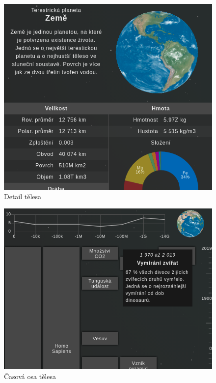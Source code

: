 \documentclass[a4paper,12pt]{article}
\begin{document}
\begin{figure}[H]
\begin{center}
\includegraphics[width=350pt]{Images/Body.png}
\caption{Detail tělesa}
\end{center}
\end{figure}

\begin{figure}[H]
\begin{center}
\includegraphics[width=350pt]{Images/Timeline.png}
\caption{Časová osa tělesa}
\end{center}
\end{figure}
\end{document}
